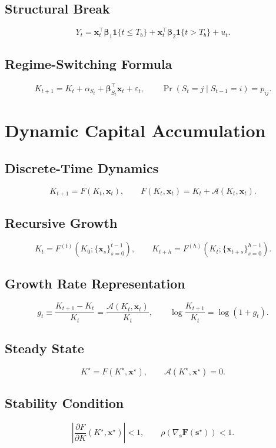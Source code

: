 \documentclass[11pt]{article}
\begin{document}
\subsection{Structural Break}
\[
Y_t=\bm{x}_t^\top\bm{\beta}_1\mathbf{1}\{t\le T_b\}+\bm{x}_t^\top\bm{\beta}_2\mathbf{1}\{t>T_b\}+u_t.
\]

\subsection{Regime-Switching Formula}
\[
K_{t+1}=K_t+\alpha_{S_t}+\bm{\beta}_{S_t}^\top\bm{x}_t+\varepsilon_t,
\qquad \Pr(S_t=j\mid S_{t-1}=i)=p_{ij}.
\]

\section{Dynamic Capital Accumulation}

\subsection{Discrete-Time Dynamics}
\[
K_{t+1}=F(K_t,\bm{x}_t),
\qquad F(K_t,\bm{x}_t)=K_t+\mathcal{A}(K_t,\bm{x}_t).
\]

\subsection{Recursive Growth}
\[
K_t=F^{(t)}(K_0;\{\bm{x}_s\}_{s=0}^{t-1}),
\qquad K_{t+h}=F^{(h)}(K_t;\{\bm{x}_{t+s}\}_{s=0}^{h-1}).
\]

\subsection{Growth Rate Representation}
\[
g_t\equiv\frac{K_{t+1}-K_t}{K_t}=\frac{\mathcal{A}(K_t,\bm{x}_t)}{K_t},
\qquad \log\frac{K_{t+1}}{K_t}=\log(1+g_t).
\]

\subsection{Steady State}
\[
K^{\star}=F(K^{\star},\bm{x}^{\star}),
\qquad \mathcal{A}(K^{\star},\bm{x}^{\star})=0.
\]

\subsection{Stability Condition}
\[
\left|\frac{\partial F}{\partial K}(K^{\star},\bm{x}^{\star})\right|<1,
\qquad \rho\!\left(\nabla_{\bm{s}}\bm{F}(\bm{s}^{\star})\right)<1.
\]
\end{document}
